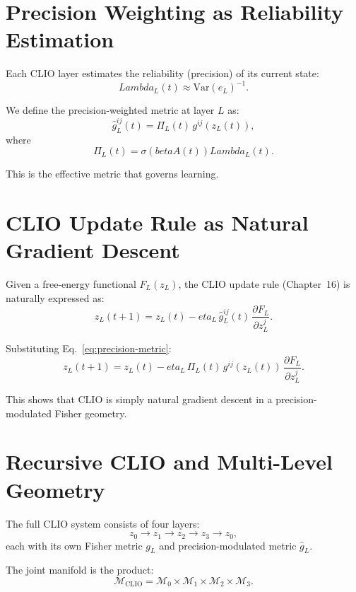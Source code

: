 \documentclass[12pt,oneside]{book}
\theoremstyle{plain}
\theoremstyle{definition}
\def\beta{beta}%
\def\eta{eta}%
\def\Lambda{Lambda}%
\begin{document}
\section{Precision Weighting as Reliability Estimation}

Each CLIO layer estimates the reliability (precision) of its current state:
\[
\Lambda_L(t) \approx \mathrm{Var}(e_L)^{-1}.
\]

We define the precision-weighted metric at layer $L$ as:
\begin{equation}
\label{eq:precision-metric}
\hat g^{ij}_L(t)
=
\Pi_L(t)\, g^{ij}(z_L(t)),
\end{equation}
where
\begin{equation}
\label{eq:PiL-def}
\Pi_L(t)
=
\sigma(\beta A(t)) \Lambda_L(t).
\end{equation}

This is the effective metric that governs learning.

\section{CLIO Update Rule as Natural Gradient Descent}

Given a free-energy functional $F_L(z_L)$, the CLIO update rule
(Chapter~16) is naturally expressed as:
\begin{equation}
\label{eq:CLIO-update}
z_L(t+1)
=
z_L(t)
-
\eta_L\,
\hat g^{ij}_L(t)\,
\frac{\partial F_L}{\partial z_L^j}.
\end{equation}

Substituting Eq.~\eqref{eq:precision-metric}:
\begin{equation}
z_L(t+1)
=
z_L(t)
-
\eta_L\, \Pi_L(t)\,
g^{ij}(z_L(t))\,
\frac{\partial F_L}{\partial z_L^j}.
\end{equation}

This shows that CLIO is simply natural gradient descent in a
precision-modulated Fisher geometry.

\section{Recursive CLIO and Multi-Level Geometry}

The full CLIO system consists of four layers:
\[
z_0 \rightarrow z_1 \rightarrow z_2 \rightarrow z_3 \rightarrow z_0,
\]
each with its own Fisher metric $g_L$ and precision-modulated metric $\hat g_L$.

The joint manifold is the product:
\[
\mathcal{M}_{\mathrm{CLIO}}
=
\mathcal{M}_0 \times \mathcal{M}_1 \times
\mathcal{M}_2 \times \mathcal{M}_3.
\]
\end{document}

